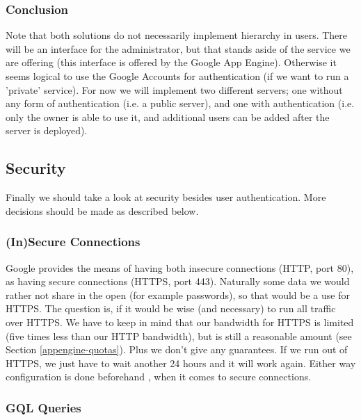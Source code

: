 \subsubsection{Conclusion}
Note that both solutions do not necessarily implement hierarchy in users. There
will be an interface for the administrator, but that stands aside of the service
we are offering (this interface is offered by the Google App Engine). Otherwise
it seems logical to use the Google Accounts for authentication (if we want to run
a 'private' service). For now we will implement two different servers; one
without any form of authentication (i.e. a public server), and one with
authentication (i.e. only the owner is able to use it, and additional users can
be added after the server is deployed).

\subsection{Security}
\label{server-design-security}
Finally we should take a look at security besides user authentication. More
decisions should be made as described below.

\subsubsection{(In)Secure Connections}
Google provides the means of having both insecure connections (HTTP, port 80), as
having secure connections (HTTPS, port 443). Naturally some data we would rather
not share in the open (for example passwords), so that would be a use for HTTPS.
The question is, if it would be wise (and necessary) to run all traffic over
HTTPS. We have to keep in mind that our bandwidth for HTTPS is limited (five
times less than our HTTP bandwidth), but is still a reasonable amount (see
Section \ref{appengine-quotas}). Plus we don't give any guarantees. If we run
out of HTTPS, we just have to wait another 24 hours and it will work again. Either way
configuration is done beforehand , when it comes to secure connections.

\subsubsection{GQL Queries}

